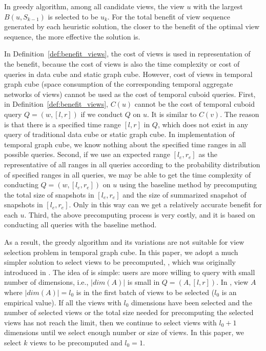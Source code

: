 \documentclass[10pt,journal,compsoc]{IEEEtran}
\begin{document}
In greedy algorithm, among all candidate views, the view $ u $ with the largest $ B(u,S_{k-1}) $ is selected to be $ u_k $. For the total benefit of view sequence generated by each heuristic solution, the closer to the benefit of the optimal view sequence, the more effective the solution is.

In Definition~\ref{def:benefit_views}, the cost of views is used in representation of the benefit, because the cost of views is also the time complexity or cost of queries in data cube and static graph cube. However, cost of views in temporal graph cube (space consumption of the corresponding temporal aggregate networks of views) cannot be used as the cost of temporal cuboid queries. First, in Definition~\ref{def:benefit_views}, $ C(u) $ cannot be the cost of temporal cuboid query $ Q=(w,[l,r]) $ if we conduct $ Q $ on $ u $. It is similar to $ C(v) $. The reason is that there is a specified time range $ [l,r] $ in $ Q $, which does not exist in any query of traditional data cube or static graph cube. In implementation of temporal graph cube, we know nothing about the specified time ranges in all possible queries. Second, if we use an expected range $ [l_e,r_e] $ as the representative of all ranges in all queries according to the probability distribution of specified ranges in all queries, we may be able to get the time complexity of conducting $ Q=(w,[l_e,r_e]) $ on $ u $ using the baseline method by precomputing the total size of snapshots in $ [l_e,r_e] $ and the size of summarized snapshot of snapshots in $ [l_e,r_e] $. Only in this way can we get a relatively accurate benefit for each $ u $. Third, the above precomputing process is very costly, and it is based on conducting all queries with the baseline method. %

As a result, the greedy algorithm and its variations are not suitable for view selection problem in temporal graph cube. In this paper, we adopt a much simpler solution to select views to be precomputed, , which was originally introduced in \cite{zhao2011graph}. The idea of  is simple: users are more willing to query with small number of dimensions, i.e., $ |dim(A)| $ is small in $ Q=(A,[l,r]) $. In , view $ A $ where $ |dim(A)|=l_0 $ is in the first batch of views to be selected ($ l_0 $ is an empirical value). If all the views with $ l_0 $ dimensions have been selected and the number of selected views or the total size needed for precomputing the selected views has not reach the limit, then we continue to select views with $ l_0+1 $ dimensions until we select enough number or size of views. In this paper, we select $ k $ views to be precomputed and $ l_0=1 $.
\end{document}

